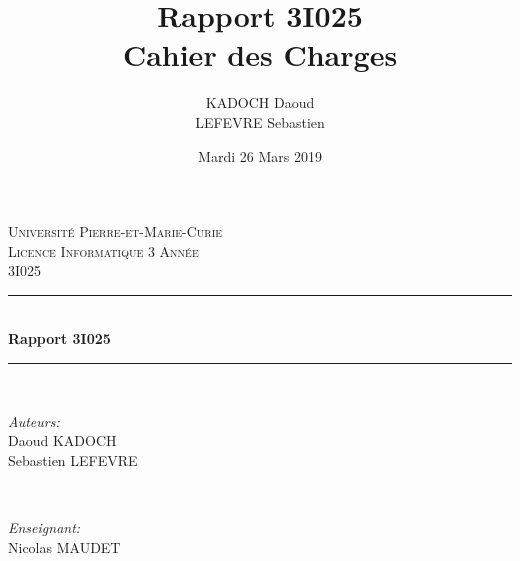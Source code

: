 \documentclass{article}
\date{Mardi 26 Mars 2019}
\author{KADOCH Daoud\\LEFEVRE Sebastien}
\title{\LARGE{Rapport 3I025\\}Cahier des Charges}
\begin{document}
\begin{titlepage}

\newcommand{\HRule}{\rule{\linewidth}{0.5mm}} %

\center %
 

\textsc{\LARGE Université Pierre-et-Marie-Curie}\\[3cm] %
\textsc{\Large Licence Informatique 3 Année}\\[0.5cm] %
\textsc{\large 3I025}\\[2cm] %


\HRule \\[0.4cm]
{ \huge \bfseries Rapport 3I025}\\[0.4cm] %
\HRule \\[2cm]
 

\begin{minipage}{0.4\textwidth}
	\begin{flushleft} \large
	\emph{Auteurs:}\\[0.2cm]
	Daoud \textsc{KADOCH}\\ %
	Sebastien \textsc{LEFEVRE} %
	\end{flushleft}
\end{minipage}
~
\begin{minipage}{0.4\textwidth}
	\begin{flushright} \large
	\emph{Enseignant:} \\[0.2cm]
	Nicolas \textsc{MAUDET}
	\end{flushright}
\end{minipage}\\[4cm]


\end{titlepage}
\end{document}
